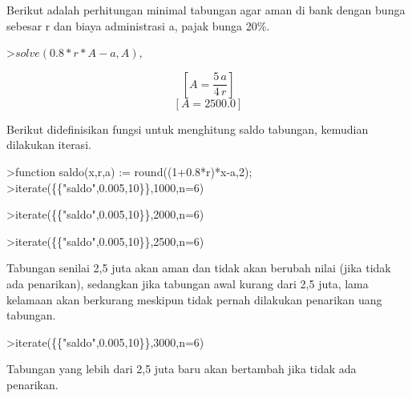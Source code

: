 \documentclass[a4paper,10pt]{article}
\begin{document}
\begin{eulernotebook}
\begin{eulercomment}
Berikut adalah perhitungan minimal tabungan agar aman di bank dengan
bunga sebesar r dan biaya administrasi a, pajak bunga 20\%.
\end{eulercomment}
\begin{eulerprompt}
>$solve(0.8*r*A-a,A), $%
\end{eulerprompt}
\begin{eulerformula}
\[
\left[ A=\frac{5\,a}{4\,r} \right]
\]
\[
\left[ A=2500.0 \right] 
\]
\end{eulerformula}
\begin{eulercomment}
Berikut didefinisikan fungsi untuk menghitung saldo tabungan, kemudian
dilakukan iterasi.
\end{eulercomment}
\begin{eulerprompt}
>function saldo(x,r,a) := round((1+0.8*r)*x-a,2);
>iterate(\{\{"saldo",0.005,10\}\},1000,n=6)
\end{eulerprompt}
\begin{euleroutput}
  [1000,  994,  987.98,  981.93,  975.86,  969.76,  963.64]
\end{euleroutput}
\begin{eulerprompt}
>iterate(\{\{"saldo",0.005,10\}\},2000,n=6)
\end{eulerprompt}
\begin{euleroutput}
  [2000,  1998,  1995.99,  1993.97,  1991.95,  1989.92,  1987.88]
\end{euleroutput}
\begin{eulerprompt}
>iterate(\{\{"saldo",0.005,10\}\},2500,n=6)
\end{eulerprompt}
\begin{euleroutput}
  [2500,  2500,  2500,  2500,  2500,  2500,  2500]
\end{euleroutput}
\begin{eulercomment}
Tabungan senilai 2,5 juta akan aman dan tidak akan berubah nilai (jika
tidak ada penarikan), sedangkan jika tabungan awal kurang dari 2,5
juta, lama kelamaan akan berkurang meskipun tidak pernah dilakukan
penarikan uang tabungan.
\end{eulercomment}
\begin{eulerprompt}
>iterate(\{\{"saldo",0.005,10\}\},3000,n=6)
\end{eulerprompt}
\begin{euleroutput}
  [3000,  3002,  3004.01,  3006.03,  3008.05,  3010.08,  3012.12]
\end{euleroutput}
\begin{eulercomment}
Tabungan yang lebih dari 2,5 juta baru akan bertambah jika tidak ada
penarikan.


\end{eulercomment}
\end{eulernotebook}
\end{document}
